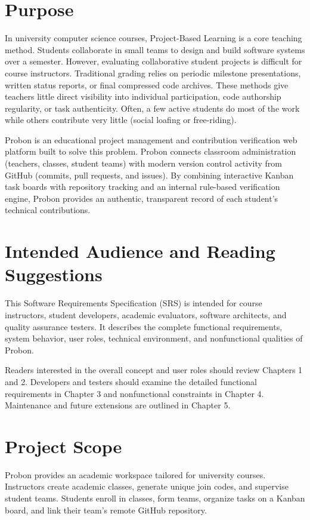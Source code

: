 \documentclass{scrreprt}
\begin{document}
\section{Purpose}\label{sec:purpose}
In university computer science courses, Project-Based Learning is a core teaching method. Students collaborate in small teams to design and build software systems over a semester. However, evaluating collaborative student projects is difficult for course instructors. Traditional grading relies on periodic milestone presentations, written status reports, or final compressed code archives. These methods give teachers little direct visibility into individual participation, code authorship regularity, or task authenticity. Often, a few active students do most of the work while others contribute very little (social loafing or free-riding).

Probon is an educational project management and contribution verification web platform built to solve this problem. Probon connects classroom administration (teachers, classes, student teams) with modern version control activity from GitHub (commits, pull requests, and issues). By combining interactive Kanban task boards with repository tracking and an internal rule-based verification engine, Probon provides an authentic, transparent record of each student's technical contributions.

\section{Intended Audience and Reading Suggestions}\label{sec:audience}
This Software Requirements Specification (SRS) is intended for course instructors, student developers, academic evaluators, software architects, and quality assurance testers. It describes the complete functional requirements, system behavior, user roles, technical environment, and nonfunctional qualities of Probon.

Readers interested in the overall concept and user roles should review Chapters 1 and 2. Developers and testers should examine the detailed functional requirements in Chapter 3 and nonfunctional constraints in Chapter 4. Maintenance and future extensions are outlined in Chapter 5.

\section{Project Scope}\label{sec:scope}
Probon provides an academic workspace tailored for university courses. Instructors create academic classes, generate unique join codes, and supervise student teams. Students enroll in classes, form teams, organize tasks on a Kanban board, and link their team's remote GitHub repository.
\end{document}
